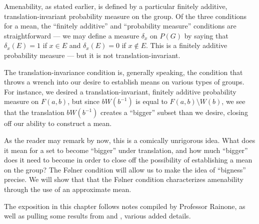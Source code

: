 Amenability, as stated earlier, is defined by a particular finitely additive, translation-invariant probability measure on the group. Of the three conditions for a mean, the ``finitely additive'' and ``probability measure'' conditions are straightforward --- we may define a measure $\delta_x$ on $P(G)$ by saying that $\delta_x(E) = 1$ if $x\in E$ and $\delta_x(E) = 0$ if $x\notin E$. This is a finitely additive probability measure --- but it is not translation-invariant.\newline

The translation-invariance condition is, generally speaking, the condition that throws a wrench into our desire to establish means on various types of groups. For instance, we desired a translation-invariant, finitely additive probability measure on $F(a,b)$, but since $bW\left( b^{-1} \right)$ is equal to $F(a,b)\setminus W(b)$, we see that the translation $bW\left( b^{-1} \right)$ creates a ``bigger'' subset than we desire, closing off our ability to construct a mean.\newline

As the reader may remark by now, this is a comically unrigorous idea. What does it mean for a set to become ``bigger'' under translation, and how much ``bigger'' does it need to become in order to close off the possibility of establishing a mean on the group? The Følner condition will allow us to make the idea of ``bigness'' precise. We will show that that the Følner condition characterizes amenability through the use of an approximate mean.\newline

The exposition in this chapter follows notes compiled by Professor Rainone, as well as pulling some results from \cite{tao_ping_pong_lemma} and \cite{loh_geometric_group_theory}, various added details.
